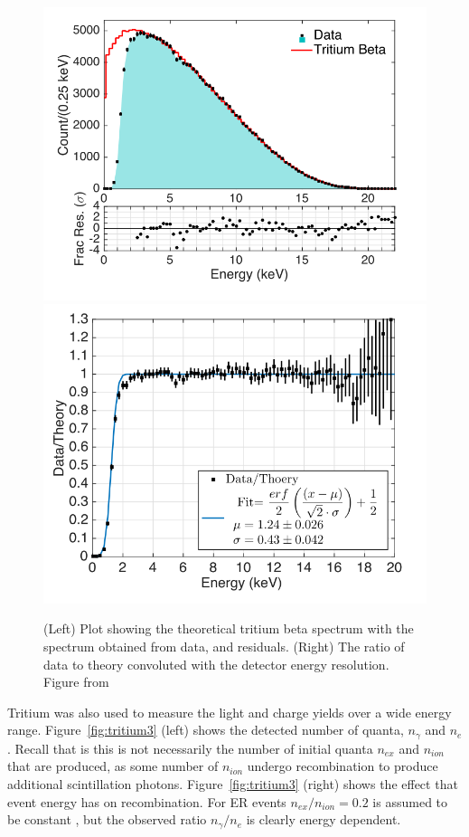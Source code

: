 \begin{figure}[htbp]
\begin{center}
\includegraphics[width=\halffig]{figures/lux/lux_tritium1a.png}
\includegraphics[width=\halffig]{figures/lux/lux_tritium1b.png}
\caption{ (Left) Plot showing the theoretical tritium beta spectrum with the spectrum obtained from data, and residuals. (Right) The ratio of data to theory convoluted with the detector energy resolution. Figure from \cite{LUXTritium}}
\label{fig:tritium1}
\end{center}
\end{figure}

Tritium was also used to measure the light and charge yields over a wide energy range. Figure~\ref{fig:tritium3} (left) shows the detected number of quanta, $n_{\gamma}$ and $n_{e}$. Recall that is this is not necessarily the number of initial quanta $n_{ex}$ and $n_{ion}$ that are produced, as some number of $n_{ion}$ undergo recombination to produce additional scintillation photons.  Figure~\ref{fig:tritium3} (right) shows the effect that event energy has on recombination. For \ac{ER} events $n_{ex} / n_{ion} = 0.2$ is assumed to be constant \cite{LUXYieldsAndRecombination}, but the observed ratio $n_{\gamma} / n_{e}$ is clearly energy dependent.

